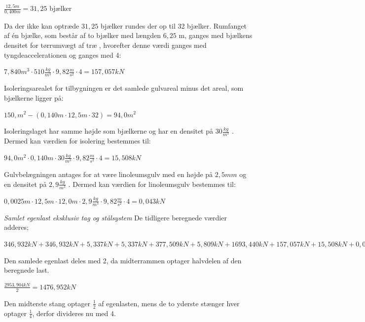 \begin{center}
	$\frac{12,\!5 m}{0,\!400 m}=31,\!25$ bjælker
\end{center} 

Da der ikke kan optræde $31,\!25$ bjælker rundes der op til 32 bjælker.
\newline
\newline
Rumfanget af én bjælke, som består af to bjælker med længden $6,\!25$ m, ganges med bjælkens densitet for tørrumvægt af træ \citep{torrumvagt}, hvorefter denne værdi ganges med tyngdeaccelerationen og ganges med 4: 
\begin{center}
	$7,\!840 m^3\cdot 510 \frac{kg}{m^3}\cdot 9,\!82 \frac{m}{s^2}\cdot 4=157,\!057 kN$
\end{center}

Isoleringsarealet for tilbygningen er det samlede gulvareal minus det areal, som bjælkerne ligger på:
\begin{center}
	$150,\! m^2 - (0,\!140 m\cdot 12,\!5 m\cdot 32)=94,\!0 m^2$
\end{center}

Isoleringslaget har samme højde som bjælkerne og har en densitet på $30 \frac{kg}{m^3}$ \citep{densitet}. Dermed kan værdien for isolering bestemmes til:
\begin{center}
	$94,\!0 m^2\cdot 0,\!140 m\cdot 30 \frac{kg}{m^3}\cdot 9,\!82 \frac{m}{s^2}\cdot 4=15,\!508 kN$
\end{center}

Gulvbelægningen antages for at være linoleumsgulv med en højde på $2,\!5 mm$ og en densitet på $2,\!9 \frac{kg}{m^3}$ \citep{linoleum}. 
Dermed kan værdien for linoleumsgulv bestemmes til:
\begin{center}
	$0,\!0025 m\cdot 12,\!5 m\cdot 12,\!0 m\cdot 2,\!9 \frac{kg}{m^3}\cdot 9,\!82 \frac{m}{s^2}\cdot 4=0,\!043 kN$
\end{center}

\textit{Samlet egenlast eksklusiv tag og stålsystem}
\newline
De tidligere beregnede værdier adderes; 
\begin{center}
	$346,\!932 kN + 346,\!932 kN + 5,\!337 kN + 5,\!337 kN + 377,\!509 kN + 5,\!809 kN + 1693,\!440 kN + 157,\!057 kN + 15,\!508 kN + 0,\!043 kN = 2953,\!904 kN$
\end{center}
Den samlede egenlast deles med 2, da midterrammen optager halvdelen af den beregnede last. 
\begin{center}
	$\frac{2953,904 kN}{2} =  1476,\!952 kN$
\end{center}
Den midterste stang optager $\frac{1}{2}$ af egenlasten, mens de to yderste stænger hver optager $\frac{1}{4}$, derfor divideres nu med 4.

